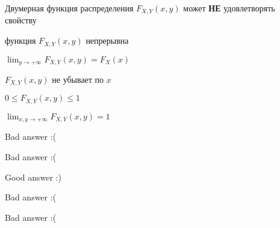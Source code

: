 
\begin{question}
Двумерная функция распределения \(F_{X,Y}(x,y)\) может \textbf{НЕ}
удовлетворять свойству
\begin{answerlist}
  \item функция \(F_{X,Y}(x, y)\) непрерывна
  \item \(\lim_{y \to +\infty} F_{X,Y}(x,y) = F_X(x)\)
  \item \(F_{X,Y}(x,y)\) не убывает по \(x\)
  \item \(0 \leq F_{X,Y}(x, y)\leq 1\)
  \item \(\lim_{x,y \to +\infty} F_{X,Y}(x,y) = 1\)
\end{answerlist}
\end{question}

\begin{solution}
\begin{answerlist}
  \item Bad answer :(
  \item Bad answer :(
  \item Good answer :)
  \item Bad answer :(
  \item Bad answer :(
\end{answerlist}
\end{solution}

